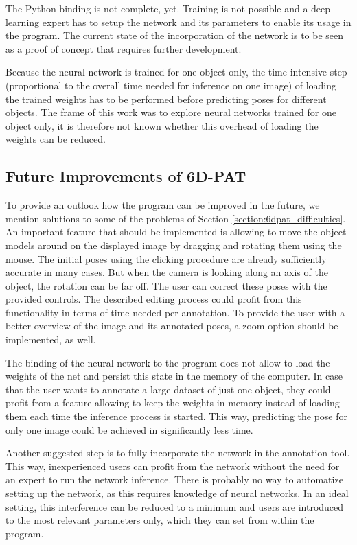 The Python binding is not complete, yet. Training is not possible and a deep learning expert has to setup the network and its parameters to enable its usage in the program. The current state of the incorporation of the network is to be seen as a proof of concept that requires further development.

Because the neural network is trained for one object only, the time-intensive step (proportional to the overall time needed for inference on one image) of loading the trained weights has to be performed before predicting poses for different objects. The frame of this work was to explore neural networks trained for one object only, it is therefore not known whether this overhead of loading the weights can be reduced.

\subsection{Future Improvements of 6D-PAT}


To provide an outlook how the program can be improved in the future, we mention solutions to some of the problems of Section \ref{section:6dpat_difficulties}. An important feature that should be implemented is allowing to move the object models around on the displayed image by dragging and rotating them using the mouse. The initial poses using the clicking procedure are already sufficiently accurate in many cases. But when the camera is looking along an axis of the object, the rotation can be far off. The user can correct these poses with the provided controls. The described editing process could profit from this functionality in terms of time needed per annotation. To provide the user with a better overview of the image and its annotated poses, a zoom option should be implemented, as well.

The binding of the neural network to the program does not allow to load the weights of the net and persist this state in the memory of the computer. In case that the user wants to annotate a large dataset of just one object, they could profit from a feature allowing to keep the weights in memory instead of loading them each time the inference process is started. This way, predicting the pose for only one image could be achieved in significantly less time.

Another suggested step is to fully incorporate the network in the annotation tool. This way, inexperienced users can profit from the network without the need for an expert to run the network inference. There is probably no way to automatize setting up the network, as this requires knowledge of neural networks. In an ideal setting, this interference can be reduced to a minimum and users are introduced to the most relevant parameters only, which they can set from within the program.